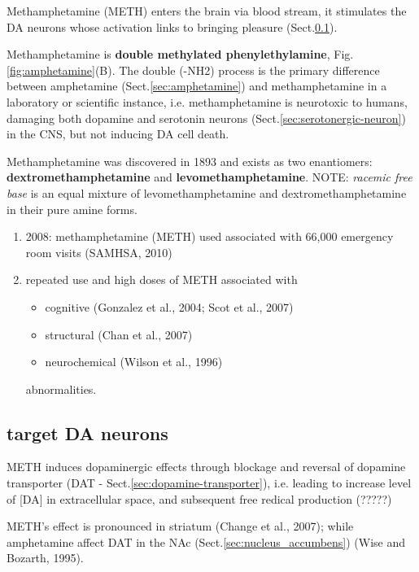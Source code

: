 Methamphetamine (METH) enters the brain via blood stream, it stimulates the DA
neurons whose activation links to bringing pleasure
(Sect.\ref{sec:METH-target-DA-neurons}).

Methamphetamine is {\bf double methylated phenylethylamine},
Fig.\ref{fig:amphetamine}(B).
The double (-NH2) process is the primary difference between amphetamine
(Sect.\ref{sec:amphetamine}) and methamphetamine in a laboratory or scientific
instance, i.e. methamphetamine is neurotoxic to humans, damaging both dopamine
and serotonin neurons (Sect.\ref{sec:serotonergic-neuron}) in the CNS, but not
inducing DA cell death.

Methamphetamine was discovered in 1893 and exists as two enantiomers:
{\bf dextromethamphetamine} and {\bf levomethamphetamine}.
NOTE: {\it racemic free base} is an equal mixture of levomethamphetamine and
dextromethamphetamine in their pure amine forms.
    
\begin{enumerate}
  \item 2008: methamphetamine (METH) used associated with 66,000 emergency room
  visits (SAMHSA, 2010)
  
  \item repeated use and high doses of METH associated with 
  \begin{itemize}
    \item cognitive  (Gonzalez et al., 2004; Scot et al., 2007)
    \item structural  (Chan et al., 2007)
    \item neurochemical  (Wilson et al., 1996)
  \end{itemize}
  abnormalities.
  
\end{enumerate}

\subsection{target DA neurons}
\label{sec:METH-target-DA-neurons}

METH induces dopaminergic effects through blockage and reversal of dopamine
transporter (DAT - Sect.\ref{sec:dopamine-transporter}), i.e. leading to
increase level of [DA] in extracellular space, and subsequent free redical
production (?????)

METH's effect is pronounced in striatum (Change et al., 2007); while amphetamine
affect DAT in the NAc (Sect.\ref{sec:nucleus_accumbens}) (Wise and Bozarth,
1995).

